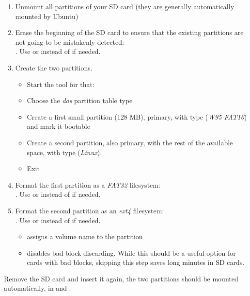 \begin{enumerate}

\item Unmount all partitions of your SD card (they are generally
  automatically mounted by Ubuntu)

\item Erase the beginning of the SD card to ensure that the existing
  partitions are not going to be mistakenly detected:\\
  . Use
   or  instead of  if needed.

\item Create the two partitions.

  \begin{itemize}

  \item Start the  tool for that:\\

  \item Choose the {\em dos} partition table type

  \item Create a first small partition (128 MB), primary, with type
     ({\em W95 FAT16}) and mark it bootable

  \item Create a second partition, also primary, with the rest of the
    available space, with type  ({\em Linux}).

  \item Exit 

  \end{itemize}

\item Format the first partition as a {\em FAT32} filesystem:\\
  . Use 
  or  instead of  if needed.

\item Format the second partition as an {\em ext4} filesystem:\\
  . Use
   or  instead of  if needed.

\begin{itemize}
\item {} assigns a volume name to the partition
\item {} disables bad block discarding. While this
      should be a useful option for cards with bad blocks, skipping
      this step saves long minutes in SD cards.
\end{itemize}
\end{enumerate}

Remove the SD card and insert it again, the two partitions should be
mounted automatically, in  and
.
